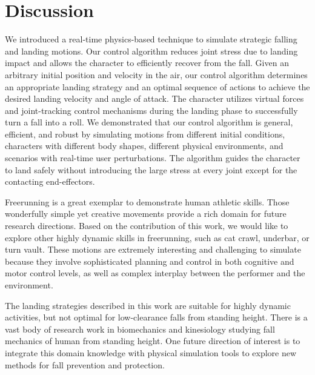 \section {Discussion}

We introduced a real-time physics-based technique to simulate
strategic falling and landing motions. 
Our control algorithm reduces
joint stress due to landing impact and allows the character to
efficiently recover from the fall.
 Given an arbitrary initial position
and velocity in the air, our control algorithm determines an
appropriate landing strategy and an optimal sequence of actions to
achieve the desired landing velocity and angle of attack. The
character utilizes virtual forces and joint-tracking control
mechanisms during the landing phase to successfully turn a fall into a
roll. We demonstrated that our control algorithm is general,
efficient, and robust by simulating motions from different initial
conditions, characters with different body shapes, different physical
environments, and scenarios with real-time user perturbations.  The
algorithm guides the character to land safely without introducing the
large stress at every joint except for the contacting end-effectors.

Freerunning is a great exemplar to demonstrate human athletic
skills. Those wonderfully simple yet creative movements provide a
rich domain for future research directions. Based on the contribution
of this work, we would like to explore other highly dynamic skills in
freerunning, such as cat crawl, underbar, or turn vault. These motions
are extremely interesting and challenging to simulate because they
involve sophisticated planning and control in both cognitive and motor
control levels, as well as complex interplay between the performer and
the environment.

The landing strategies described in this work are suitable for highly
dynamic activities, but not optimal for low-clearance falls from
standing height. There is a vast body of research work in biomechanics
and kinesiology studying fall mechanics of human from standing
height. One future direction of interest is to integrate this domain
knowledge with physical simulation tools to explore new methods for
fall prevention and protection.

